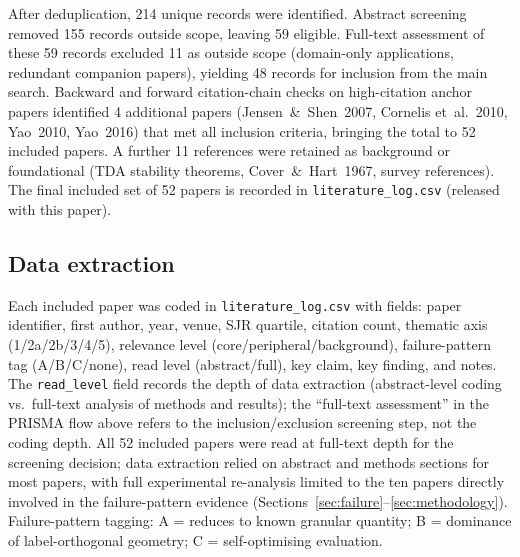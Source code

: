 After deduplication, 214 unique records were identified.
Abstract screening removed 155 records outside scope, leaving 59 eligible.
Full-text assessment of these 59 records excluded 11 as outside scope
(domain-only applications, redundant companion papers), yielding 48 records
for inclusion from the main search.  Backward and forward citation-chain
checks on high-citation anchor papers identified 4 additional papers
(Jensen~\&~Shen~2007, Cornelis et~al.~2010, Yao~2010, Yao~2016) that met
all inclusion criteria, bringing the total to 52 included papers.
A further 11 references were retained as background or foundational
(TDA stability theorems, Cover~\&~Hart~1967, survey references).
The final included set of 52 papers is recorded in
\texttt{literature\_log.csv} (released with this paper).

\subsection*{Data extraction}
Each included paper was coded in \texttt{literature\_log.csv} with fields:
paper identifier, first author, year, venue, SJR quartile, citation count,
thematic axis (1/2a/2b/3/4/5), relevance level (core/peripheral/background),
failure-pattern tag (A/B/C/none), read level (abstract/full), key claim,
key finding, and notes.  The \texttt{read\_level} field records the depth of
data extraction (abstract-level coding vs.\ full-text analysis of methods and
results); the ``full-text assessment'' in the PRISMA flow above refers to the
inclusion/exclusion screening step, not the coding depth.  All 52 included
papers were read at full-text depth for the screening decision; data
extraction relied on abstract and methods sections for most papers, with full
experimental re-analysis limited to the ten papers directly involved in the
failure-pattern evidence (Sections~\ref{sec:failure}--\ref{sec:methodology}).
Failure-pattern tagging: A = reduces to known granular
quantity; B = dominance of label-orthogonal geometry; C = self-optimising
evaluation.

